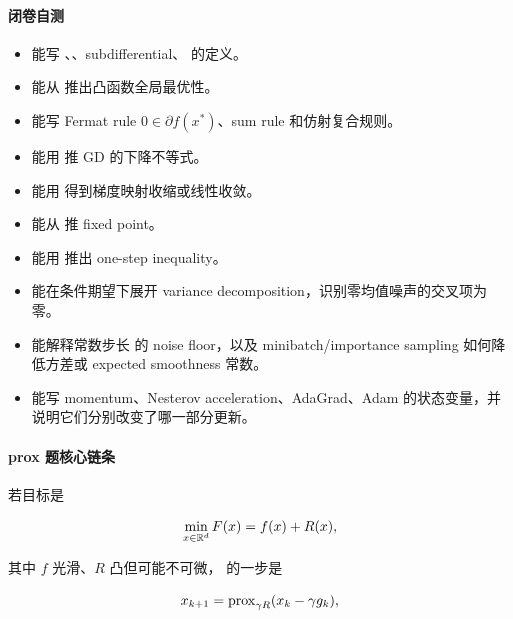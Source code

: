 
\paragraph{闭卷自测}

\begin{itemize}
  \item 能写 、、subdifferential、 的定义。
  \item 能从 推出凸函数全局最优性。
  \item 能写 Fermat rule \(0\in\partial f(x^*)\)、sum rule 和仿射复合规则。
  \item 能用  推 GD 的下降不等式。
  \item 能用 得到梯度映射收缩或线性收敛。
  \item 能从  推 fixed point。
  \item 能用 推出 one-step inequality。
  \item 能在条件期望下展开 variance decomposition，识别零均值噪声的交叉项为零。
  \item 能解释常数步长  的 noise floor，以及 minibatch/importance sampling 如何降低方差或 expected smoothness 常数。
  \item 能写 momentum、Nesterov acceleration、AdaGrad、Adam 的状态变量，并说明它们分别改变了哪一部分更新。
\end{itemize}

\paragraph{prox 题核心链条}

若目标是

\[
  \min_{x\in\mathbb{R}^d}
  F(x)=f(x)+R(x),
\]

其中 \(f\) 光滑、\(R\) 凸但可能不可微， 的一步是

\[
  x_{k+1}
  =
  \operatorname{prox}_{\gamma R}(x_k-\gamma g_k),
\]

